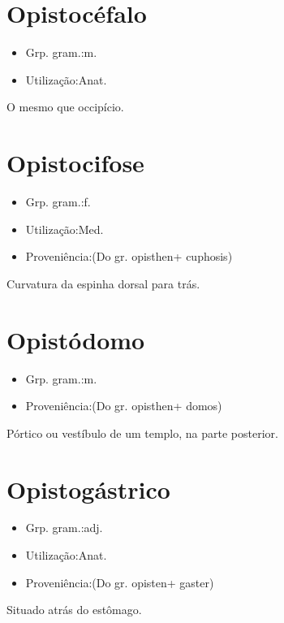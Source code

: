 \section{Opistocéfalo}
\begin{itemize}
\item {Grp. gram.:m.}
\end{itemize}
\begin{itemize}
\item {Utilização:Anat.}
\end{itemize}
O mesmo que \textunderscore occipício\textunderscore .
\section{Opistocifose}
\begin{itemize}
\item {Grp. gram.:f.}
\end{itemize}
\begin{itemize}
\item {Utilização:Med.}
\end{itemize}
\begin{itemize}
\item {Proveniência:(Do gr. \textunderscore opisthen\textunderscore  + \textunderscore cuphosis\textunderscore )}
\end{itemize}
Curvatura da espinha dorsal para trás.
\section{Opistódomo}
\begin{itemize}
\item {Grp. gram.:m.}
\end{itemize}
\begin{itemize}
\item {Proveniência:(Do gr. \textunderscore opisthen\textunderscore  + \textunderscore domos\textunderscore )}
\end{itemize}
Pórtico ou vestíbulo de um templo, na parte posterior.
\section{Opistogástrico}
\begin{itemize}
\item {Grp. gram.:adj.}
\end{itemize}
\begin{itemize}
\item {Utilização:Anat.}
\end{itemize}
\begin{itemize}
\item {Proveniência:(Do gr. \textunderscore opisten\textunderscore  + \textunderscore gaster\textunderscore )}
\end{itemize}
Situado atrás do estômago.
